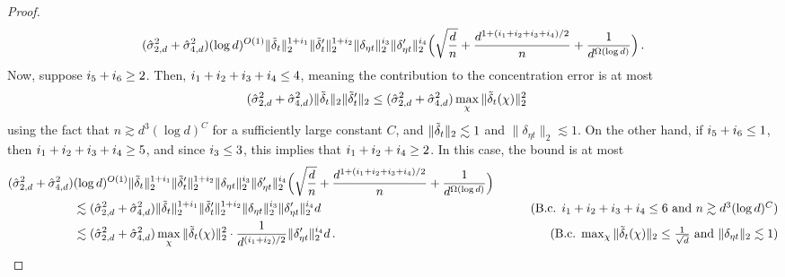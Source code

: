\begin{proof}
\begin{align}
(\hat{\sigma}_{2, d}^2 + \hat{\sigma}_{4, d}^2) (\log d)^{O(1)} \|{\tilde{\delta}}_t\|_2^{1 + i_{1}} \|{\tilde{\delta}}_t'\|_2^{1 + i_{2}} \|\delta_{\eta t}\|_2^{i_{3}} \|\delta_{\eta t}'\|_2^{i_{4}} \Big(\sqrt{\frac{d}{n}} + \frac{d^{1 + (i_{1} + i_{2} + i_{3} + i_{4})/2}}{n} + \frac{1}{d^{\Omega(\log d)}} \Big) \,.
\end{align}
Now, suppose $i_{5} + i_{6} \geq 2$. Then, $i_{1} + i_{2} + i_{3} + i_{4} \leq 4$, meaning the contribution to the concentration error is at most
\begin{align}
(\hat{\sigma}_{2, d}^2 + \hat{\sigma}_{4, d}^2)\|{\tilde{\delta}}_t\|_2 \|{\tilde{\delta}}_t'\|_2
& \leq (\hat{\sigma}_{2, d}^2 + \hat{\sigma}_{4, d}^2) \max_{\chi} \|{\tilde{\delta}}_t(\chi)\|_2^2
\end{align}
using the fact that $n \gtrsim d^3 (\log d)^C$ for a sufficiently large constant $C$, and $\|{\tilde{\delta}}_t\|_2 \lesssim 1$ and $\|\delta_{\eta t}\|_2 \lesssim 1$. On the other hand, if $i_{5} + i_{6} \leq 1$, then $i_{1} + i_{2} + i_{3} + i_{4} \geq 5$, and since $i_{3} \leq 3$, this implies that $i_{1} + i_{2} + i_{4} \geq 2$. In this case, the bound is at most
\begin{align}
(\sigmaCoeffTwo^2 + \sigmaCoeffFour^2) & (\log d)^{O(1)} \|\deltaSingleGD_t\|_2^{1 + \idx{1}} \|\deltaSingleGD_t'\|_2^{1 + \idx{2}} \|\delta_{\eta t}\|_2^{\idx{3}} \|\delta_{\eta t}'\|_2^{\idx{4}} \Big(\sqrt{\frac{d}{n}} + \frac{d^{1 + (\idx{1} + \idx{2} + \idx{3} + \idx{4})/2}}{n} + \frac{1}{d^{\Omega(\log d)}} \Big) \\
& \lesssim (\sigmaCoeffTwo^2 + \sigmaCoeffFour^2) \|\deltaSingleGD_t\|_2^{1 + \idx{1}} \|\deltaSingleGD_t'\|_2^{1 + \idx{2}} \|\delta_{\eta t}\|_2^{\idx{3}} \|\delta_{\eta t}'\|_2^{\idx{4}} d
& \tag{B.c. $\idx{1} + \idx{2} + \idx{3} + \idx{4} \leq 6$ and $n \gtrsim d^3 (\log d)^C$} \\
& \lesssim (\sigmaCoeffTwo^2 + \sigmaCoeffFour^2) \max_\chi \|\deltaSingleGD_t(\chi)\|_2^2 \cdot \frac{1}{d^{(\idx{1} + \idx{2})/2}} \|\delta_{\eta t}'\|_2^{\idx{4}} d \period
& \tag{B.c. $\max_\chi \|\deltaSingleGD_t(\chi)\|_2 \leq \frac{1}{\sqrt{d}}$ and $\|\delta_{\eta t}\|_2 \lesssim 1$}
\end{align}

\end{proof}
